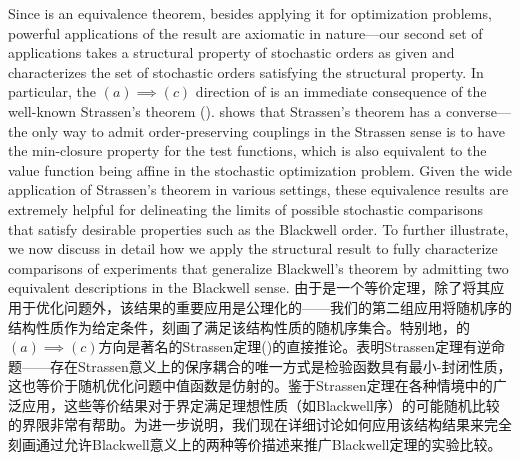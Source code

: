 \documentclass[12pt,letterpaper]{article}
\newenvironment{original}{\color{black}}{}
\newenvironment{translation}{\color{blue}}{}
\theoremstyle{plain}
\theoremstyle{definition}
\theoremstyle{remark}
\theoremstyle{definition}
\begin{document}
\begin{original}
Since  is an equivalence theorem, besides applying it for optimization problems, powerful applications of the result are axiomatic in nature---our second set of applications takes a structural property of stochastic orders as given and characterizes the set of stochastic orders satisfying the structural property. In particular, the $(a) \implies (c)$ direction of  is an immediate consequence of the well-known Strassen's theorem (\citealt{Strassen1965}).   shows that Strassen's theorem has a converse---the only way to admit order-preserving couplings in the Strassen sense is to have the min-closure property for the test functions, which is also equivalent to the value function being affine in the stochastic optimization problem. Given the wide application of Strassen's theorem in various settings, these equivalence results are extremely helpful for delineating the limits of possible stochastic comparisons that satisfy desirable properties such as the Blackwell order. To further illustrate, we now discuss in detail how we apply the structural result to fully characterize comparisons of experiments that generalize Blackwell's theorem by admitting two equivalent descriptions in the Blackwell sense.
\end{original}
\begin{translation}
由于是一个等价定理，除了将其应用于优化问题外，该结果的重要应用是公理化的——我们的第二组应用将随机序的结构性质作为给定条件，刻画了满足该结构性质的随机序集合。特别地，的$(a) \implies (c)$方向是著名的Strassen定理(\citealt{Strassen1965})的直接推论。表明Strassen定理有逆命题——存在Strassen意义上的保序耦合的唯一方式是检验函数具有最小-封闭性质，这也等价于随机优化问题中值函数是仿射的。鉴于Strassen定理在各种情境中的广泛应用，这些等价结果对于界定满足理想性质（如Blackwell序）的可能随机比较的界限非常有帮助。为进一步说明，我们现在详细讨论如何应用该结构结果来完全刻画通过允许Blackwell意义上的两种等价描述来推广Blackwell定理的实验比较。
\end{translation}
\end{document}
